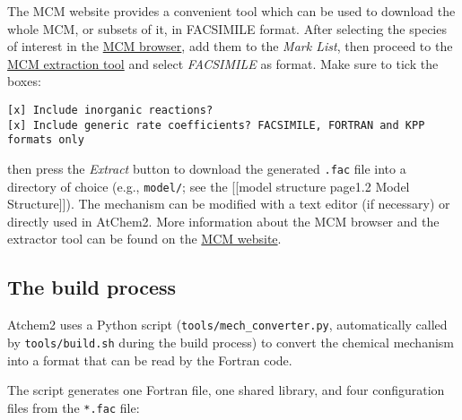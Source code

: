 The MCM website provides a convenient tool which can be used to download
the whole MCM, or subsets of it, in FACSIMILE format. After selecting
the species of interest in the
\href{http://mcm.leeds.ac.uk/MCMv3.3.1/roots.htt}{MCM browser}, add them
to the \emph{Mark List}, then proceed to the
\href{http://mcm.leeds.ac.uk/MCMv3.3.1/extract.htt}{MCM extraction tool}
and select \emph{FACSIMILE} as format. Make sure to tick the boxes:

\begin{verbatim}
[x] Include inorganic reactions?
[x] Include generic rate coefficients? FACSIMILE, FORTRAN and KPP formats only
\end{verbatim}

then press the \emph{Extract} button to download the generated
\texttt{.fac} file into a directory of choice (e.g., \texttt{model/};
see the {[}{[}model structure page\textbar{}1.2 Model Structure{]}{]}).
The mechanism can be modified with a text editor (if necessary) or
directly used in AtChem2. More information about the MCM browser and the
extractor tool can be found on the \href{http://mcm.leeds.ac.uk}{MCM
website}.

\hypertarget{the-build-process}{%
\subsection{The build process}\label{the-build-process}}

Atchem2 uses a Python script (\texttt{tools/mech\_converter.py},
automatically called by \texttt{tools/build.sh} during the build
process) to convert the chemical mechanism into a format that can be
read by the Fortran code.

The script generates one Fortran file, one shared library, and four
configuration files from the \texttt{*.fac} file:

